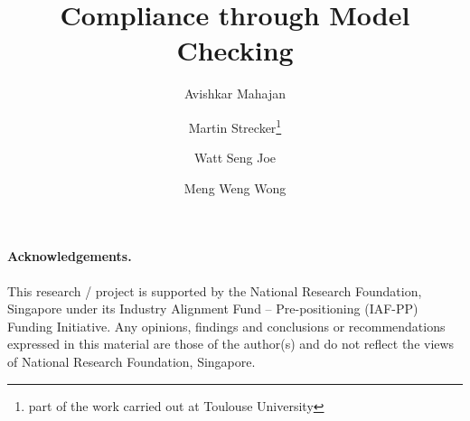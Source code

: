\documentclass{llncs}
\begin{document}


\title{Compliance through Model Checking}

\author{
Avishkar Mahajan \and
Martin Strecker\thanks{part of the work carried out at Toulouse University}
\and
Watt Seng Joe \and
Meng Weng Wong
}


\maketitle

\begin{abstract}

\end{abstract}









\paragraph{Acknowledgements.}
This research / project is supported by the National Research Foundation,
Singapore under its Industry Alignment Fund – Pre-positioning (IAF-PP) Funding
Initiative. Any opinions, findings and conclusions or recommendations
expressed in this material are those of the author(s) and do not reflect the
views of National Research Foundation, Singapore.

% 



% 
% 
% 
% 
\end{document}
